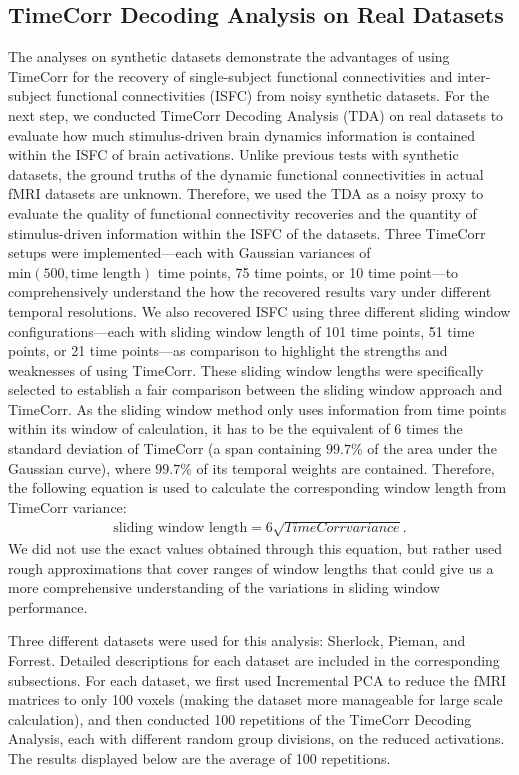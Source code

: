 \documentclass[11pt]{article}
\begin{document}
\subsection{TimeCorr Decoding Analysis on Real Datasets}
The analyses on synthetic datasets demonstrate the advantages of using TimeCorr for the recovery of single-subject functional connectivities and inter-subject functional connectivities (ISFC) from noisy synthetic datasets. For the next step, we conducted TimeCorr Decoding Analysis (TDA) on real datasets to evaluate how much stimulus-driven brain dynamics information is contained within the ISFC of brain activations. Unlike previous tests with synthetic datasets, the ground truths of the dynamic functional connectivities in actual fMRI datasets are unknown. Therefore, we used the TDA as a noisy proxy to evaluate the quality of functional connectivity recoveries and the quantity of stimulus-driven information within the ISFC of the datasets. Three TimeCorr setups were implemented---each with Gaussian variances of $\text{min}(500,\text{time length})$ time points, 75 time points, or 10 time point---to comprehensively understand the how the recovered results vary under different temporal resolutions. We also recovered ISFC using three different sliding window configurations---each with sliding window length of 101 time points, 51 time points, or 21 time points---as comparison to highlight the strengths and weaknesses of using TimeCorr. These sliding window lengths were specifically selected to establish a fair comparison between the sliding window approach and TimeCorr. As the sliding window method only uses information from time points within its window of calculation, it has to be the equivalent of 6 times the standard deviation of TimeCorr (a span containing $99.7\%$ of the area under the Gaussian curve), where $99.7\%$ of its temporal weights are contained. Therefore, the following equation is used to calculate the corresponding window length from TimeCorr variance:
\begin{align*}
\text{sliding window length} = 6\sqrt{TimeCorr variance}.
\end{align*}
We did not use the exact values obtained through this equation, but rather used rough approximations that cover ranges of window lengths that could give us a more comprehensive understanding of the variations in sliding window performance.

Three different datasets were used for this analysis: Sherlock, Pieman, and Forrest. Detailed descriptions for each dataset are included in the corresponding subsections. For each dataset, we first used Incremental PCA to reduce the fMRI matrices to only 100 voxels (making the dataset more manageable for large scale calculation), and then conducted 100 repetitions of the TimeCorr Decoding Analysis, each with different random group divisions, on the reduced activations. The results displayed below are the average of 100 repetitions.
\end{document}
